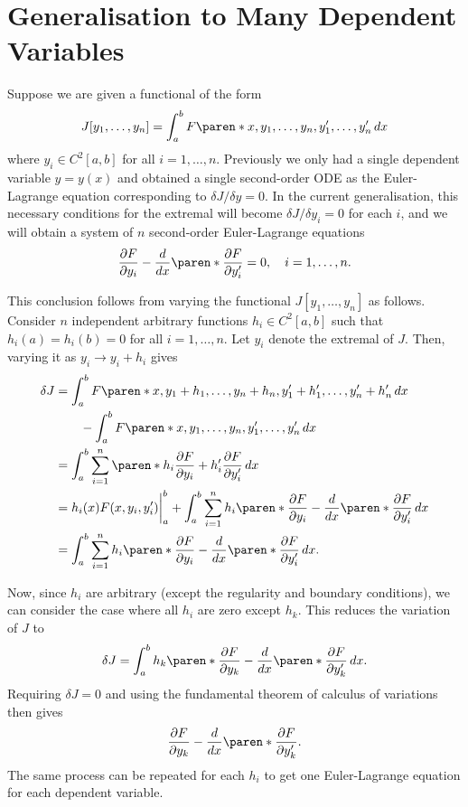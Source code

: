 \documentclass[11pt]{penrose}
\begin{document}
\section{Generalisation to Many Dependent Variables}
Suppose we are given a functional of the form
\begin{equation}
    J[y_1, \dots, y_n] = \int_a^b F\paren*{x, y_1, \dots, y_n, y'_1, \dots, y'_n} \,dx
\end{equation}
where $y_i \in C^2 [a,b]$ for all $i=1, \dots, n$. Previously we only had a single dependent variable $y = y(x)$ and obtained a single second-order ODE as the Euler-Lagrange equation corresponding to $\delta J / \delta y = 0$. In the current generalisation, this necessary conditions for the extremal will become $\delta J / \delta y_i = 0$ for each $i$, and we will obtain a system of $n$ second-order Euler-Lagrange equations
\begin{equation}
    \frac{\pd F}{\pd y_i} - \frac{d}{dx} \paren*{\frac{\pd F}{\pd y'_i}} = 0,
    \quad i = 1, \dots, n.
\end{equation}

This conclusion follows from varying the functional $J[y_1, \dots, y_n]$ as follows. Consider $n$ independent arbitrary functions $h_i \in C^2[a,b]$ such that $h_i(a) = h_i(b) = 0$ for all $i = 1, \dots, n$. Let $y_i$ denote the extremal of $J$. Then, varying it as $y_i \to y_i + h_i$ gives
\begin{align}
    \delta J
    &= \int_a^b F\paren*{x, y_1 + h_1, \dots, y_n + h_n, y'_1 + h'_1, \dots, y'_n + h'_n} \,dx\\
    &\qquad - \int_a^b F\paren*{x, y_1, \dots, y_n, y'_1, \dots, y'_n} \,dx\\
    &= \int_a^b \sum_{i=1}^{n} \paren*{h_i \frac{\pd F}{\pd y_i} + h'_i \frac{\pd F}{\pd y'_i}} \,dx\\
    &= \bigg. h_i(x) F(x, y_i, y'_i) \bigg|_{a}^{b}
    + \int_a^b \sum_{i=1}^{n} h_i \paren*{ \frac{\pd F}{\pd y_i} - \frac{d}{dx} \paren*{\frac{\pd F}{\pd y'_i}}} \,dx\\
    &= \int_a^b \sum_{i=1}^{n} h_i \paren*{ \frac{\pd F}{\pd y_i} - \frac{d}{dx} \paren*{\frac{\pd F}{\pd y'_i}}} \,dx.
\end{align}

Now, since $h_i$ are arbitrary (except the regularity and boundary conditions), we can consider the case where all $h_i$ are zero except $h_k$. This reduces the variation of $J$ to
\begin{equation}
    \delta J = \int_a^b h_k \paren*{ \frac{\pd F}{\pd y_k} - \frac{d}{dx} \paren*{\frac{\pd F}{\pd y'_k}}} \,dx.
\end{equation}
Requiring $\delta J = 0$ and using the fundamental theorem of calculus of variations then gives
\begin{equation}
    \frac{\pd F}{\pd y_k} - \frac{d}{dx} \paren*{\frac{\pd F}{\pd y'_k}}.
\end{equation}
The same process can be repeated for each $h_i$ to get one Euler-Lagrange equation for each dependent variable.
\end{document}
